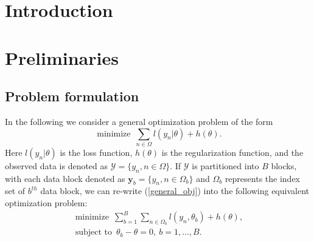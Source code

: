 \documentclass{article}
\DeclareMathOperator*{\minimize}{minimize}
\DeclareMathOperator*{\st}{subject~to}
\newcommand{\1}[0]{\ensuremath{\boldsymbol{1}}\xspace}
\newcommand{\yv}[0]{\ensuremath{\boldsymbol{y}}\xspace}
\begin{document}

\begin{abstract} 

\end{abstract} 

\section{Introduction}

\section{Preliminaries}
\subsection{Problem formulation}
In the following we consider a general optimization problem of the form
\begin{equation}\label{general_obj}
\minimize ~ \sum_{n\in\Omega}l(y_n|\theta) + h(\theta).
\end{equation}
Here $l(y_n|\theta)$ is the loss function, $h(\theta)$ is the regularization function, and the observed data is denoted as $\mathcal{Y} = \{y_n, n\in\Omega\}$. If $\mathcal{Y}$ is partitioned into $B$ blocks, with each data block denoted as $\yv_b = \{y_n, n \in \Omega_b\}$ and $\Omega_b$ represents the index set of $b^{th}$ data block,  we can re-write (\ref{general_obj}) into the following equivalent optimization problem:
\begin{equation}\label{admm_obj}
\begin{gathered}
\minimize ~ \sum_{b=1}^B\sum_{n\in\Omega_b}l(y_n,\theta_b) + h(\theta),\\
\st ~ \theta_b - \theta = 0, ~ b = 1,\ldots,B.
\end{gathered}
\end{equation}
\end{document}
